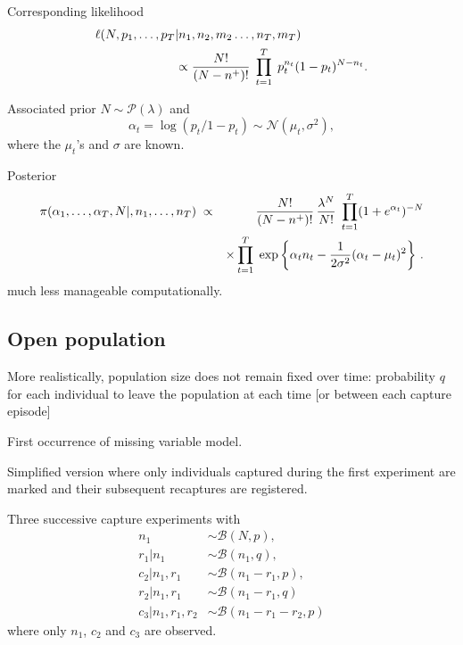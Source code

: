 \begin{slide}
\vs\pause
Corresponding likelihood
\begin{align*}
\ell(N,p_1, \ldots,p_T&|n_1,n_2,m_2\ldots,n_T,m_T)\\
&\propto {N!\over (N - n^+)!} \; 
\prod_{t=1}^{T} \; p_{t}^{n_{t}} (1 - p_{t})^{N-n_{t}}.
\end{align*}

\end{slide}\begin{slide}

Associated prior $N \sim\mathscr{P}(\lambda)$ and
$$
\alpha_{t} = \log \left({p_{t}\big/ 1 - p_{t}}\right)
\sim {\mathscr{N}}(\mu_{t},\sigma^{2}),
$$
where the $\mu_t$'s and $\sigma$ are known.

\pause
Posterior 
\small\begin{eqnarray*}
\pi(\alpha_1,\ldots,\alpha_T,N|,n_1,\ldots,n_T) \; & \propto & {N!\over (N - n^+)!}\,\frac{\lambda^N}{N!}
\; \prod_{t=1}^T (1 + e^{\alpha_{t}})^{-N} \\
&& \times \prod_{t=1}^T \; \exp \left\{\alpha_t n_t
- {1\over 2\sigma^2 } (\alpha_{t} - \mu_{t})^{2} \right\} \,.
\end{eqnarray*}\normalsize
much less manageable computationally. 

\end{slide}\subsection{Open population}\begin{slide}

More realistically, population size does not remain fixed over time: 
probability $q$ for each individual to leave the population at each time [or between
each capture episode] 

\vs\pause
First occurrence of missing variable model.

\vs\pause
Simplified version
where only individuals captured during the first experiment are marked and 
their subsequent recaptures are registered.

\end{slide}\begin{slide}

Three successive capture experiments with
\small\begin{align*}
n_1&\sim\mathscr{B}(N,p),\\
r_1|n_1&\sim\mathscr{B}(n_1,q),\\
c_2|n_1,r_1&\sim\mathscr{B}(n_1-r_1,p),\\ 
r_2|n_1,r_1&\sim\mathscr{B}(n_1-r_1,q)\\
c_3|n_1,r_1,r_2&\sim\mathscr{B}(n_1-r_1-r_2,p)
\end{align*}\normalsize
where only $n_1$, $c_2$ and $c_3$ are observed. 


\end{slide}

